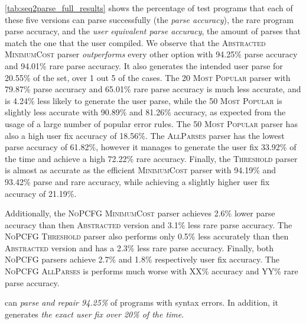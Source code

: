 \autoref{tab:seq2parse_full_results} shows the percentage of test programs that
each of these five versions can parse successfully (\ie the \emph{parse
accuracy}), the rare program parse accuracy, and the \emph{user equivalent parse
accuracy}, \ie the amount of parses that match the one that the user compiled.
We observe that the \textsc{Abstracted} \textsc{MinimumCost} parser
\emph{outperforms} every other option with 94.25\% parse accuracy and 94.01\%
rare parse accuracy. It also generates the intended user parse for 20.55\% of
the set, \ie over 1 out 5 of the cases. The \textsc{20 Most Popular} parser with
79.87\% parse accuracy and 65.01\% rare parse accuracy is much less accurate,
and is 4.24\% less likely to generate the user parse, while the \textsc{50 Most
Popular} is slightly less accurate with 90.89\% and 81.26\% accuracy, as
expected from the usage of a large number of popular error rules. The \textsc{50
Most Popular} parser has also a high user fix accuracy of 18.56\%. The
\textsc{AllParses} parser has the lowest parse accuracy of 61.82\%, however it
manages to generate the user fix 33.92\% of the time and achieve a high 72.22\%
rare accuracy. Finally, the \textsc{Threshold} parser is almost as accurate as
the efficient \textsc{MinimumCost} parser with 94.19\% and 93.42\% parse and
rare accuracy, while achieving a slightly higher user fix accuracy of 21.19\%.

Additionally, the \textsc{NoPCFG} \textsc{MinimumCost} parser achieves 2.6\%
lower parse accuracy than then \textsc{Abstracted} version and 3.1\% less rare
parse accuracy. The \textsc{NoPCFG} \textsc{Threshold} parser also performs only
0.5\% less accurately than then \textsc{Abstracted} version and has a 2.3\% less
rare parse accuracy. Finally, both \textsc{NoPCFG} parsers achieve 2.7\% and
1.8\% respectively user fix accuracy. The \textsc{NoPCFG} \textsc{AllParses} is
performs much worse with XX\% accuracy and YY\% rare parse accuracy.

\begin{framed}
  \noindent \toolname can \emph{parse and repair 94.25\%} of programs with
  syntax errors. In addition, it generates \emph{the exact user fix over 20\% of
  the time}.
\end{framed}

